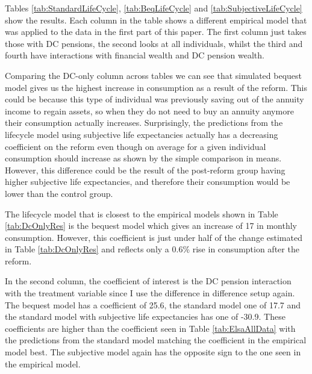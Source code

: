 \documentclass[12pt]{article}
\begin{document}
\begin{landscape}
    \linespread{1.25}

    
\end{landscape}

\begin{landscape}
    \linespread{1.25}

    
\end{landscape}

\begin{landscape}
    \linespread{1.25}

    
\end{landscape}


Tables \ref{tab:StandardLifeCycle}, \ref{tab:BeqLifeCycle} and
\ref{tab:SubjectiveLifeCycle} show the results. Each column in the table shows a
different empirical model that was applied to the data in the first part of this
paper. The first column just takes those with DC pensions, the second looks at
all individuals, whilst the third and fourth have interactions with financial
wealth and DC pension wealth.

Comparing the DC-only column across tables we can see that simulated bequest
model gives us the highest increase in consumption as a result of the reform.
This could be because this type of individual was previously saving out of the
annuity income to regain assets, so when they do not need to buy an annuity
anymore their consumption actually increases. Surprisingly, the predictions from
the lifecycle model using subjective life expectancies actually has a decreasing
coefficient on the reform even though on average for a given individual
consumption should increase as shown by the simple comparison in means. However,
this difference could be the result of the post-reform group having higher
subjective life expectancies, and therefore their consumption would be lower
than the control group.

The lifecycle model that is closest to the empirical models shown in Table
\ref{tab:DcOnlyRes} is the bequest model which gives an increase of 17 in
monthly consumption. However, this coefficient is just under half of the change
estimated in Table \ref{tab:DcOnlyRes} and reflects only a 0.6\% rise in
consumption after the reform.

In the second column, the coefficient of interest is the DC pension interaction
with the treatment variable since I use the difference in difference setup
again. The bequest model has a coefficient of 25.6, the standard model one of
17.7 and the standard model with subjective life expectancies has one of -30.9.
These coefficients are higher than the coefficient seen in Table
\ref{tab:ElsaAllData} with the predictions from the standard model matching the
coefficient in the empirical model best. The subjective model again has the
opposite sign to the one seen in the empirical model.
\end{document}
